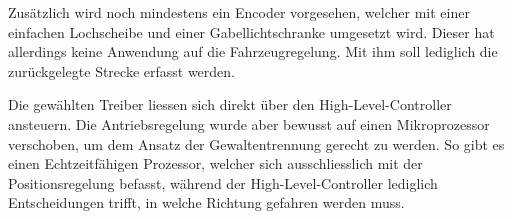 \documentclass[main.tex]{subfiles} %
\begin{document}
Zusätzlich wird noch mindestens ein Encoder vorgesehen, welcher mit einer
einfachen Lochscheibe und einer Gabellichtschranke umgesetzt wird. Dieser hat
allerdings keine Anwendung auf die Fahrzeugregelung. Mit ihm soll lediglich die
zurückgelegte Strecke erfasst werden.

Die gewählten Treiber liessen sich direkt über den High-Level-Controller
ansteuern. Die Antriebsregelung wurde aber bewusst auf einen Mikroprozessor
verschoben, um dem Ansatz der Gewaltentrennung gerecht zu werden. So gibt es
einen Echtzeitfähigen Prozessor, welcher sich ausschliesslich mit der
Positionsregelung befasst, während der High-Level-Controller lediglich
Entscheidungen trifft, in welche Richtung gefahren werden muss.
\end{document}
